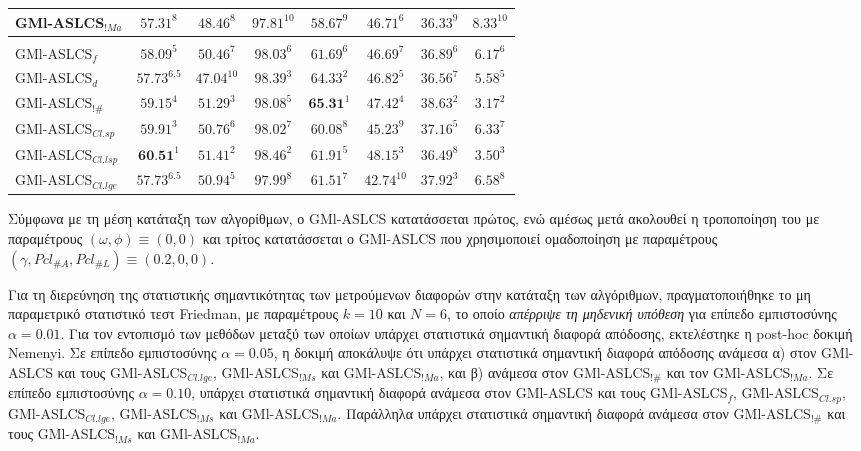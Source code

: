 \begin{table}[!h]
\begin{center}
\begin{tabular}{l|cccccc|c}
    GMl-ASLCS$_{!Ma}$    & $57.31^8$     & $48.46^8$    & $97.81^{10}$ & $58.67^9$ & $46.71^6$    & $36.33^9$    & $8.33^{10}$         \\ \hline \\ [-2ex]
    GMl-ASLCS$_{f}$      & $58.09^5$     & $50.46^7$    & $98.03^6$    & $61.69^6$ & $46.69^7$    & $36.89^6$    & $6.17^6$        \\
    GMl-ASLCS$_{d}$      & $57.73^{6.5}$ & $47.04^{10}$ & $98.39^3$    & $64.33^2$ & $46.82^5$    & $36.56^7$    & $5.58^5$          \\
    GMl-ASLCS$_{!\#}$    & $59.15^4$     & $51.29^3$    & $98.08^5$    & $\textbf{65.31}^1$ & $47.42^4$    & $38.63^2$    & $3.17^2$         \\
    GMl-ASLCS$_{Cl.sp}$  & $59.91^3$     & $50.76^6$    & $98.02^7$    & $60.08^8$      & $45.23^9$    & $37.16^5$    & $6.33^7$          \\
    GMl-ASLCS$_{Cl.lsp}$ & $\textbf{60.51}^1$     & $51.41^2$    & $98.46^2$    & $61.91^5$ & $48.15^3$    & $36.49^8$    & $3.50^3$          \\
    GMl-ASLCS$_{Cl.lge}$ & $57.73^{6.5}$ & $50.94^5$    & $97.99^8$    & $61.51^7$ & $42.74^{10}$ & $37.92^3$    & $6.58^8$         \\ \hline
    \end{tabular}
        \end{center}

\end{table}


Σύμφωνα με τη μέση κατάταξη των αλγορίθμων, ο GMl-ASLCS κατατάσσεται πρώτος, ενώ αμέσως μετά ακολουθεί η τροποποίηση του με παραμέτρους $(\omega, \phi) \equiv (0,0)$ και τρίτος κατατάσσεται ο GMl-ASLCS που χρησιμοποιεί ομαδοποίηση με παραμέτρους $(\gamma, Pcl_{\#A}, Pcl_{\#L}) \equiv (0.2, 0, 0)$.

Για τη διερεύνηση της στατιστικής σημαντικότητας των μετρούμενων διαφορών στην κατάταξη των αλγόριθμων, πραγματοποιήθηκε το μη παραμετρικό στατιστικό τεστ Friedman, με παραμέτρους $k=10$ και $N=6$, το οποίο \emph{απέρριψε τη μηδενική υπόθεση} για επίπεδο εμπιστοσύνης $\alpha = 0.01$. Για τον εντοπισμό των μεθόδων μεταξύ των οποίων υπάρχει στατιστικά σημαντική διαφορά απόδοσης, εκτελέστηκε η post-hoc δοκιμή Nemenyi. Σε επίπεδο εμπιστοσύνης $\alpha=0.05$, η δοκιμή αποκάλυψε ότι υπάρχει στατιστικά σημαντική διαφορά απόδοσης ανάμεσα α) στον GMl-ASLCS και τους GMl-ASLCS$_{Cl.lge}$, GMl-ASLCS$_{!Ms}$ και GMl-ASLCS$_{!Ma}$, και β) ανάμεσα στον GMl-ASLCS$_{!\#}$ και τον GMl-ASLCS$_{!Ma}$. Σε επίπεδο εμπιστοσύνης $\alpha=0.10$, υπάρχει στατιστικά σημαντική διαφορά ανάμεσα στον GMl-ASLCS και τους GMl-ASLCS$_{f}$, GMl-ASLCS$_{Cl.sp}$, GMl-ASLCS$_{Cl.lge}$, GMl-ASLCS$_{!Ms}$ και GMl-ASLCS$_{!Ma}$. Παράλληλα υπάρχει στατιστικά σημαντική διαφορά ανάμεσα στον GMl-ASLCS$_{!\#}$ και τους GMl-ASLCS$_{!Ms}$ και GMl-ASLCS$_{!Ma}$.




